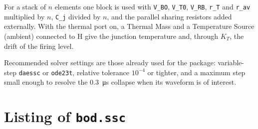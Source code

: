 \documentclass[11pt,a4paper]{article}
\newcommand{\ssc}[1]{\texttt{#1}}
\begin{document}
For a stack of $n$ elements one block is used with \ssc{V\_BO}, \ssc{V\_T0}, \ssc{V\_RB}, \ssc{r\_T} and \ssc{r\_av} multiplied by $n$, \ssc{C\_j} divided by $n$, and the parallel sharing resistors added externally. With the thermal port on, a Thermal Mass and a Temperature Source (ambient) connected to H give the junction temperature and, through $K_T$, the drift of the firing level.

Recommended solver settings are those already used for the package: variable-step \ssc{daessc} or \ssc{ode23t}, relative tolerance $10^{-4}$ or tighter, and a maximum step small enough to resolve the \SI{0.3}{\micro\second} collapse when its waveform is of interest.

\appendix
\section{Listing of \ssc{bod.ssc}}
\label{app:listing}
\end{document}

